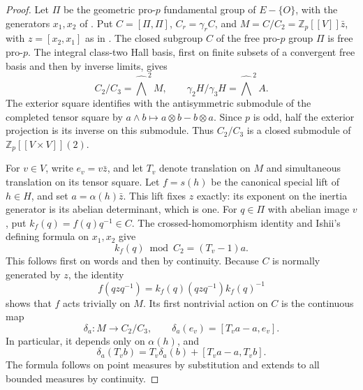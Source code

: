 \begin{proof}
Let \(\Pi\) be the geometric pro-\(p\) fundamental group
of \(E-\{O\}\), with the generators \(x_1,x_2\)
of \cite[Lemma 2.1]{Ishii}. Put \(C=[\Pi,\Pi]\), \(C_r=\gamma_rC\), and
\(M=C/C_2=\mathbb Z_p[[V]]\bar z\), with
\(z=[x_2,x_1]\) as in \cite[Lemma 2.1]{Ishii}.
The closed subgroup \(C\) of the free pro-\(p\) group
\(\Pi\) is free pro-\(p\).  The integral class-two Hall
basis, first on finite subsets of a convergent free
basis and then by inverse limits, gives
\[
 C_2/C_3=\widehat{\bigwedge}^{\,2}M,
 \qquad \gamma_2H/\gamma_3H=
            \widehat{\bigwedge}^{\,2}A.
\]
The exterior square identifies with the antisymmetric
submodule of the completed tensor square by
\(a\wedge b\mapsto a\otimes b-b\otimes a\).
Since \(p\) is odd, half the exterior projection is
its inverse on this submodule.  Thus
\(C_2/C_3\) is a closed submodule of
\(\mathbb Z_p[[V\times V]](2)\).

For \(v\in V\), write \(e_v=v\bar z\), and let
\(T_v\) denote translation on \(M\) and simultaneous
translation on its tensor square.  Let \(f=s(h)\)
be the canonical special lift of \(h\in H\), and set
\(a=\alpha(h)\bar z\).  This lift fixes \(z\) exactly:
its exponent on the inertia generator is its
abelian determinant, which is one.  For \(q\in\Pi\)
with abelian image \(v\), put
\(k_f(q)=f(q)q^{-1}\in C\).
The crossed-homomorphism identity and Ishii's defining
formula on \(x_1,x_2\) give
\[
                 k_f(q)\bmod C_2=(T_v-1)a.
\]
This follows first on words and then by continuity.
Because \(C\) is normally generated by \(z\), the identity
\[
 f(qzq^{-1})=k_f(q)(qzq^{-1})k_f(q)^{-1}
\]
shows that \(f\) acts trivially on \(M\).  Its first
nontrivial action on \(C\) is the continuous map
\[
 \delta_a:M\longrightarrow C_2/C_3,
 \qquad \delta_a(e_v)=[T_va-a,e_v].
\]
In particular, it depends only on \(\alpha(h)\), and
\begin{equation}\label{eq:cm-delta-translation}
 \delta_a(T_vb)=T_v\delta_a(b)+[T_va-a,T_vb].
\end{equation}
The formula follows on point measures by substitution
and extends to all bounded measures by continuity.


\end{proof}
